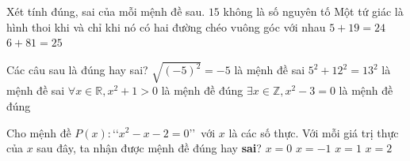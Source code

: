 
\begin{ex}%
	Xét tính đúng, sai của mỗi mệnh  đề sau.
	\choiceTF 
		{$15$ không là số nguyên tố} 
		{Một tứ giác là hình thoi khi và chỉ khi nó có hai đường chéo vuông góc với  nhau}
		 {\True$5+19=24$}
		{$6+81=25$} 
\end{ex}

\begin{ex}%
	Các câu sau là đúng  hay sai?
	 \choiceTF
		{\True $\sqrt{\left(-5\right)^2}=-5$ là mệnh  đề sai}
		{$5^2+12^2=13^2$ là mệnh đề sai} 
		{\True $\forall  x\in\mathbb{R}, x^2+1>0$ là mệnh đề đúng}
		{$\exists x\in\mathbb{Z}, x^2-3=0$  là mệnh đề đúng}
\end{ex}

\begin{ex}%
	Cho mệnh  đề $P(x)\colon$\lq\lq$x^2-x-2=0$\rq\rq~với $x$ là các số thực. Với mỗi giá trị thực của $x$ sau đây, ta nhận được mệnh đề đúng hay \textbf{sai}?
	 \choiceTF
		{$x=0$} 
		{\True $x=-1$} 
		 {$x=1$}
		{\True $x=2$} 
\end{ex}

